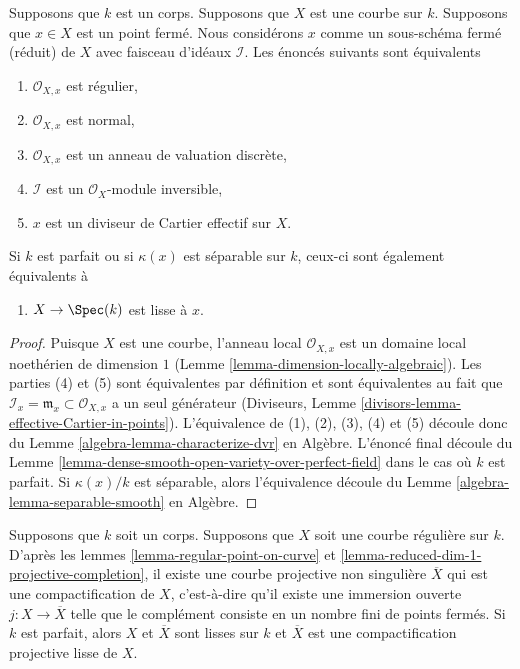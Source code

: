 \begin{lemma}
\label{lemma-regular-point-on-curve}
Supposons que $k$ est un corps. Supposons que $X$ est une courbe sur $k$. Supposons
que $x \in X$ est un point fermé. Nous considérons $x$ comme un sous-schéma fermé
(réduit) de $X$ avec faisceau d'idéaux $\mathcal{I}$. Les énoncés suivants sont équivalents
\begin{enumerate}
\item $\mathcal{O}_{X, x}$ est régulier, \item
$\mathcal{O}_{X, x}$ est normal, \item
$\mathcal{O}_{X, x}$ est un anneau de valuation discrète,
\item $\mathcal{I}$ est un $\mathcal{O}_X$-module
inversible, \item $x$ est un diviseur de Cartier effectif sur $X$.
\end{enumerate}
Si $k$ est parfait ou si $\kappa(x)$ est
séparable sur $k$, ceux-ci sont également équivalents à
\begin{enumerate}
\item [(6)] $X \to \Spec(k)$ est lisse à $x$.
\end{enumerate}
\end{lemma}

\begin{proof}
Puisque $X$ est une courbe, l'anneau local $\mathcal{O}_{X, x}$ est un
domaine local noethérien de dimension $1$ (Lemme
\ref{lemma-dimension-locally-algebraic}). Les parties (4) et (5) sont
équivalentes par définition et sont équivalentes au fait que $\mathcal{I}_x =
\mathfrak m_x \subset \mathcal{O}_{X, x}$ a un seul générateur (Diviseurs, Lemme
\ref{divisors-lemma-effective-Cartier-in-points}). L'équivalence de (1), (2),
(3), (4) et (5) découle donc du Lemme \ref{algebra-lemma-characterize-dvr} en
Algèbre. L'énoncé final découle du Lemme
\ref{lemma-dense-smooth-open-variety-over-perfect-field} dans le cas où $k$ est parfait. Si
$\kappa(x)/k$ est séparable, alors l'équivalence découle du Lemme \ref{algebra-lemma-separable-smooth} en Algèbre.
\end{proof}

\begin{remark}
\label{remark-smooth-projective-compactification}
Supposons que $k$ soit un corps. Supposons que $X$ soit une
courbe régulière sur $k$. D'après les lemmes
\ref{lemma-regular-point-on-curve} et
\ref{lemma-reduced-dim-1-projective-completion}, il existe une courbe
projective non singulière $\overline{X}$ qui est une compactification
de $X$, c'est-à-dire qu'il existe une immersion ouverte $j : X \to
\overline{X}$ telle que le complément consiste en un nombre fini de
points fermés. Si $k$ est parfait, alors $X$ et $\overline{X}$ sont lisses
sur $k$ et $\overline{X}$ est une compactification projective lisse de $X$.
\end{remark}

